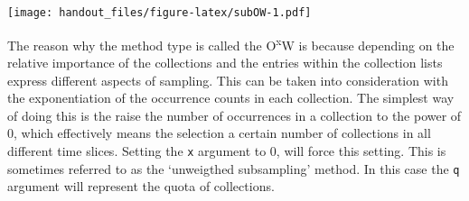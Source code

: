 \documentclass[]{article}
\newenvironment{Shaded}{\begin{snugshade}}{\end{snugshade}}
\newcommand{\DataTypeTok}[1]{\textcolor[rgb]{0.13,0.29,0.53}{#1}}
\newcommand{\DecValTok}[1]{\textcolor[rgb]{0.00,0.00,0.81}{#1}}
\newcommand{\KeywordTok}[1]{\textcolor[rgb]{0.13,0.29,0.53}{\textbf{#1}}}
\newcommand{\NormalTok}[1]{#1}
\newcommand{\OperatorTok}[1]{\textcolor[rgb]{0.81,0.36,0.00}{\textbf{#1}}}
\newcommand{\StringTok}[1]{\textcolor[rgb]{0.31,0.60,0.02}{#1}}
\begin{document}
\begin{Shaded}
\end{Shaded}

\texttt{[image: handout\_files/figure-latex/subOW-1.pdf]}

The reason why the method type is called the O\textsuperscript{x}W is
because depending on the relative importance of the collections and the
entries within the collection lists express different aspects of
sampling. This can be taken into consideration with the exponentiation
of the occurrence counts in each collection. The simplest way of doing
this is the raise the number of occurrences in a collection to the power
of 0, which effectively means the selection a certain number of
collections in all different time slices. Setting the \texttt{x}
argument to 0, will force this setting. This is sometimes referred to as
the `unweigthed subsampling' method. In this case the \texttt{q}
argument will represent the quota of collections.
\end{document}
